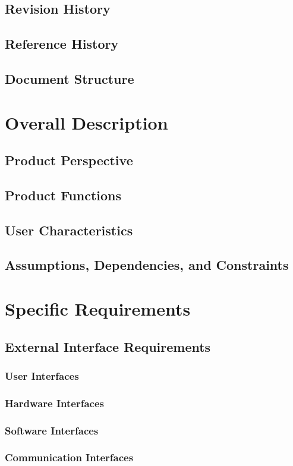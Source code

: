 \documentclass[a4paper]{article}
\begin{document}
\subsection{Revision History}
\subsection{Reference History}
\subsection{Document Structure}
\section{Overall Description}
\subsection{Product Perspective}
\subsection{Product Functions}
\subsection{User Characteristics}
\subsection{Assumptions, Dependencies, and Constraints}
\section{Specific Requirements}
\subsection{External Interface Requirements}
\subsubsection{User Interfaces}
\subsubsection{Hardware Interfaces}
\subsubsection{Software Interfaces}
\subsubsection{Communication Interfaces}
\end{document}
